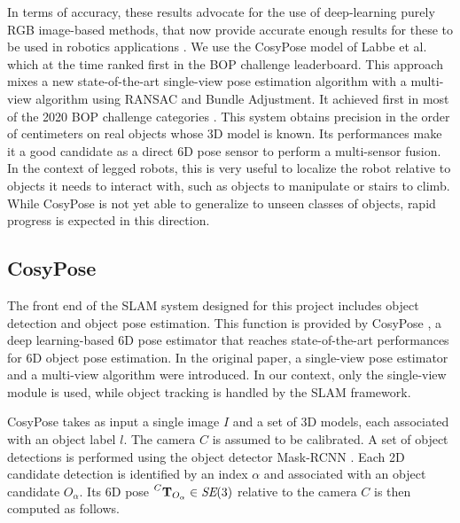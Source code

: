 In terms of accuracy, these results advocate for the use of deep-learning purely RGB image-based methods, that now provide accurate enough results 
for these to be used in robotics applications \cite{labbe2021single}. 
We use the CosyPose model of Labbe et al. \cite{labbe2020cosypose} which at the time ranked first in the BOP challenge leaderboard.
This approach mixes a new state-of-the-art single-view pose estimation algorithm with a multi-view algorithm using RANSAC and Bundle Adjustment. 
It achieved first in most of the 2020 BOP challenge categories \cite{hodan2020bop}. This system obtains precision in the order of centimeters 
on real objects whose 3D model is known. Its performances make it a good candidate as a direct 6D pose sensor to perform a multi-sensor fusion. 
In the context of legged robots, this is very useful to localize the robot relative to objects it needs to interact with, such as objects 
to manipulate or stairs to climb. While CosyPose is not yet able to generalize to unseen classes of objects, rapid progress is expected in 
this direction.

\subsection{CosyPose}
The front end of the SLAM system designed for this project includes object detection and object pose estimation. 
This function is provided by CosyPose \cite{labbe2020cosypose}, a deep learning-based 6D pose estimator that reaches state-of-the-art
 performances for 6D object pose estimation. %
In the original paper, a single-view pose estimator and a multi-view algorithm were introduced. In our context, only the single-view module is used, 
while object tracking is handled by the SLAM framework. 

CosyPose takes as input a single image $I$ and a set of 3D models, each associated with an object label $l$. The camera $C$ is assumed to be calibrated. 
A set of object detections is performed using the object detector Mask-RCNN \cite{he2018mask}. Each 2D candidate detection is identified 
by an index $\alpha$ and associated with an object candidate $O_{\alpha}$. Its 6D pose $\prescript{C}{}{{\bf T}}_{O_{\alpha}} \in \textit{SE} (3)$ relative to the camera $C$ 
is then computed as follows.

